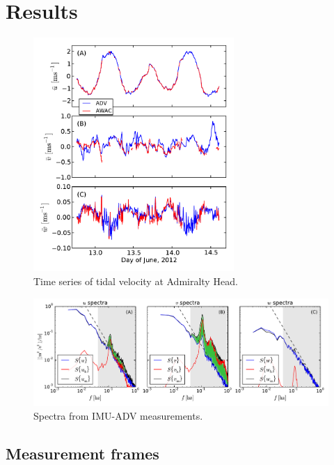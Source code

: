 \documentclass[twocol]{ametsoc}
\begin{document}
\section{Results}

\begin{figure}[t]
  \centering
  \includegraphics[width=3in]{TimeFig01}
  \caption{Time series of tidal velocity at Admiralty Head.}
  \label{fig:vel_time}
\end{figure}

\begin{figure}[t]
  \centering
  \includegraphics[width=6
in]{SpecFig02_annot}
  \caption{Spectra from IMU-ADV measurements.}
  \label{fig:spec01}
\end{figure}


\acknowledgments


\clearpage %

\appendix


\def\Amat\ensuremath{}

\subsection{Measurement frames}\label{apdx:coord-sys:meas}\label{apdx:coord-sys}
\end{document}
